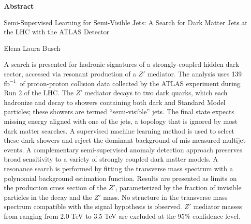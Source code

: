 
\begin{titlepage}
\begin{center}

\vspace*{1.5\baselineskip}
\textbf{\large Abstract}
 \vspace*{1\baselineskip}

Semi-Supervised Learning for Semi-Visible Jets: A Search for Dark Matter Jets at the LHC with the ATLAS Detector

 \vspace*{1\baselineskip}

Elena Laura Busch

 \vspace*{1\baselineskip}

\end{center}
\begin{flushleft}
\hspace{10mm}A search is presented for hadronic signatures of a strongly-coupled hidden dark sector, accessed via resonant production of a $Z'$ mediator. The analysis uses 139 $\text{fb}^{-1}$~of proton-proton collision data collected by the ATLAS experiment during Run 2 of the LHC. The $Z'$ mediator decays to two dark quarks, which each hadronize and decay to showers containing both dark and Standard Model particles; these showers are termed ``semi-visible'' jets. The final state expects missing energy aligned with one of the jets, a topology that is ignored by most dark matter searches. A supervised machine learning method is used to select these dark showers and reject the dominant background of mis-measured multijet events. A complementary semi-supervised anomaly detection approach preserves broad sensitivity to a variety of strongly coupled dark matter models. A resonance search is performed by fitting the transverse mass spectrum with a polynomial background estimation function. Results are presented as limits on the production cross section of the $Z'$, parameterized by the fraction of invisible particles in the decay and the $Z'$ mass. No structure in the transverse mass spectrum compatible with the signal hypothesis is observed. $Z'$ mediator masses from ranging from 2.0 TeV to 3.5 TeV are excluded at the 95\% confidence level.

\end{flushleft}
\vspace*{\fill}
\end{titlepage}
